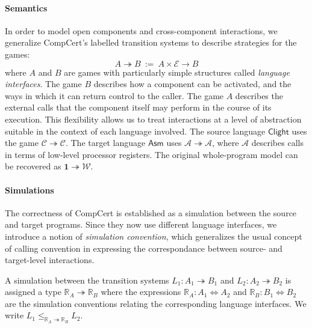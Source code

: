 \documentclass[sigplan,10pt,review,anonymous]{acmart}
\newcommand{\kw}[1]{\ensuremath{ \mathsf{#1} }}
\begin{document}
\paragraph{Semantics} %

In order to model open components and cross-component interactions,
we generalize CompCert's labelled transition systems
to describe strategies for the games:
\[ A \twoheadrightarrow B \: := \:
   A \times \mathcal{E} \rightarrow B \]
where $A$ and $B$ are games with particularly simple structures
called \emph{language interfaces}.
The game $B$ describes how a component can be activated,
and the ways in which it can return control to the caller.
The game $A$ describes the external calls that the component itself
may perform in the course of its execution.
This flexibility allows us to treat interactions
at a level of abstraction suitable in the context of each language involved.
The source language \kw{Clight} uses the game
$\mathcal{C} \twoheadrightarrow \mathcal{C}$.
The target language \kw{Asm} uses
$\mathcal{A} \twoheadrightarrow \mathcal{A}$,
where $\mathcal{A}$ describes calls
in terms of low-level processor registers.
The original whole-program model can be recovered as
$\mathbf{1} \twoheadrightarrow \mathcal{W}$.



\paragraph{Simulations} %

The correctness of CompCert is established as
a simulation between the source and target programs.
Since they now use different language interfaces,
we introduce a notion of \emph{simulation convention},
which generalizes the usual concept of calling convention
in expressing the correspondance between
source- and target-level interactions.

A simulation between the transition systems
$L_1 : A_1 \twoheadrightarrow B_1$ and
$L_2 : A_2 \twoheadrightarrow B_2$
is assigned a type $\mathbb{R}_A \twoheadrightarrow \mathbb{R}_B$
where the expressions
$\mathbb{R}_A : A_1 \Leftrightarrow A_2$ and
$\mathbb{R}_B : B_1 \Leftrightarrow B_2$
are the simulation conventions
relating the corresponding language interfaces.
We write
$L_1 \le_{\mathbb{R}_A \twoheadrightarrow \mathbb{R}_B} L_2$.
\end{document}
